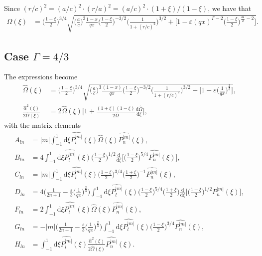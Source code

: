 \documentclass[11pt]{article}
\newcommand{\rd}{\mathrm{d}}
\newcommand{\Pnm}{P_n^{|m|}}
\newcommand{\Plm}{P_l^{|m|}}
\newcommand{\hPnm}{\widehat{\Pnm}}
\newcommand{\hPlm}{\widehat{\Plm}}
\newcommand{\hOmega}{\widehat{\Omega}}
\newcommand{\halpha}{\widehat{\alpha}}
\begin{document}
Since $(r/c)^2 = (a/c)^2 \cdot (r/a)^2 =  (a/c)^2 \cdot (1+\xi)/(1-\xi)$, we have that
\begin{align*}
\hOmega(\xi) &=\bigg(\frac{1-\xi}{2}\bigg)^{3/4}  \sqrt{\bigg( \frac{a}{c}\bigg)^3\frac{1-x}{qx} \bigg(\frac{1-\xi}{2}\bigg)^{-3/2} \bigg(\frac{1}{1+(r/c)^2}\bigg)^{3/2} 
+   \bigg[1- \varepsilon(qx)^{\Gamma-2}\bigg(\frac{1-\xi}{2}\bigg)^{\frac{3\Gamma}{2}-2} \bigg] } .
\end{align*}

\subsection{Case $\Gamma=4/3$}

The expressions become
\begin{align*}
\hOmega(\xi) &=\bigg(\frac{1-\xi}{2}\bigg)^{3/4}  \sqrt{\bigg( \frac{a}{c}\bigg)^3\frac{(1-x)}{qx} \bigg(\frac{1-\xi}{2}\bigg)^{-3/2} \bigg(\frac{1}{1+(r/c)^2}\bigg)^{3/2} 
+   \bigg[1- \varepsilon\bigg(\frac{1}{qx}\bigg)^{\frac{2}{3}} \bigg]  } , \\
\frac{\halpha^2(\xi)}{2\hOmega(\xi)} & = 2\hOmega(\xi) \bigg[1+\frac{(1+\xi)(1-\xi)}{2\hOmega}\frac{\rd \hOmega }{\rd \xi} \bigg],
\end{align*}
with the matrix elements
\begin{align*}
A_{ln} &= |m| \int_{-1}^{1} \rd \xi  \hPlm(\xi)\hOmega(\xi)\hPnm(\xi) , \\
B_{ln} &= 4 \int_{-1}^{1} \rd \xi  \hPlm(\xi) \bigg(\frac{1-\xi}{2}\bigg)^{1/2} \frac{\rd}{\rd \xi} \bigg[\bigg(\frac{1-\xi}{2}\bigg)^{5/4}\hPnm(\xi)\bigg], \\
C_{ln} &= |m| \int_{-1}^{1} \rd \xi \hPlm(\xi) \bigg(\frac{1-\xi}{2}\bigg)^{3/4}\bigg(\frac{1+\xi}{2}\bigg)^{-1}   \hPnm(\xi), \\
D_{ln} &= 4 \bigg(\frac{1}{2n+1}-\frac{\varepsilon}{3}  \bigg(\frac{1}{qx}\bigg)^{\frac{2}{3}} \bigg) \int_{-1}^{1} \rd \xi \hPlm(\xi)  \bigg(\frac{1-\xi}{2}\bigg)^{5/4} \bigg(\frac{1+\xi}{2}\bigg) 
\frac{\rd}{\rd \xi} \bigg[ \bigg(\frac{1-\xi}{2}\bigg)^{1/2}\hPnm(\xi) \bigg] ,\\
F_{ln} &=2 \int_{-1}^{1} \rd \xi  \hPlm(\xi)\hOmega(\xi)\hPnm(\xi) , \\
G_{ln} &= -|m| \bigg(\frac{1}{2n+1}-\frac{\varepsilon}{3}  \bigg(\frac{1}{qx}\bigg)^{\frac{2}{3}} \bigg)  \int_{-1}^{1} \rd \xi \hPlm(\xi)  \bigg(\frac{1-\xi}{2}\bigg)^{3/4} 
\hPnm(\xi)  ,\\
H_{ln} &=  \int_{-1}^{1} \rd \xi  \hPlm(\xi)\frac{\halpha^2(\xi)}{2\hOmega(\xi)}\hPnm(\xi) .
\end{align*}
\end{document}
